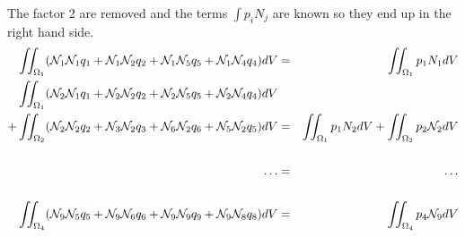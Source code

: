 The factor 2 are removed and the terms $\int p_i N_j $ are known so they end up in the right hand side.
\begin{eqnarray}
 \iint_{\Omega_1} (\bN_1 \bN_1 q_1 + \bN_1 \bN_2 q_2 + \bN_1 \bN_5 q_5 + \bN_1 \bN_4 q_4) dV 
&=& \iint_{\Omega_1} p_1 N_1 dV \nn\\
 \iint_{\Omega_1} (\bN_2 \bN_1 q_1 + \bN_2 \bN_2 q_2 + \bN_2 \bN_5 q_5 + \bN_2 \bN_4 q_4) dV \nn\\
+\iint_{\Omega_2} (\bN_2 \bN_2 q_2 + \bN_3 \bN_2 q_3 + \bN_6 \bN_2 q_6 + \bN_5 \bN_2 q_5) dV 
&=& \iint_{\Omega_1} p_1N_2 dV + \iint_{\Omega_2}  p_2 \bN_2 dV \nn\\
\nn\\
\dots &=& \dots \nn\\
\nn\\
 \iint_{\Omega_4} (\bN_9\bN_5 q_5 + \bN_9\bN_6q_6 + \bN_9\bN_9q_9 + \bN_9\bN_8q_8) dV &=&  \iint_{\Omega_4} p_4 \bN_9 dV 
\end{eqnarray}

